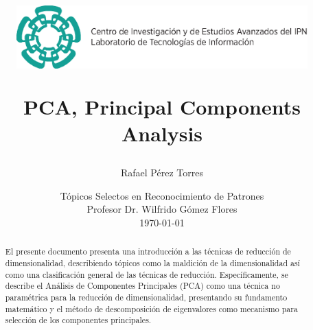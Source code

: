 \documentclass{article}
\begin{document}
	\title{
	\begin{figure}[!ht]
		\flushleft
			\includegraphics[width=\textwidth]{resources/images/cinvestav-header}
	\end{figure}
	\vspace{1cm}
	\Huge PCA, Principal Components Analysis
	\vspace{1cm}
	}
	
	
	
	\author{Rafael Pérez Torres}	
	
	
	\date{
	\large Tópicos Selectos en Reconocimiento de Patrones \\ 
	\vspace{0.8cm}
	\large Profesor Dr. Wilfrido Gómez Flores \\
	\vspace{1cm}
	\today
	}

	\maketitle
	\setlength{\parindent}{0pt}







\begin{abstract}
El presente documento presenta una introducción a las técnicas de reducción de dimensionalidad, describiendo tópicos como la maldición de la dimensionalidad así como una clasificación general de las técnicas de reducción.
Específicamente, se describe el Análisis de Componentes Principales (PCA) como una técnica no paramétrica para la reducción de dimensionalidad, presentando su fundamento matemático y el método de descomposición de eigenvalores como mecanismo para selección de los componentes principales.
\end{abstract}
\end{document}
